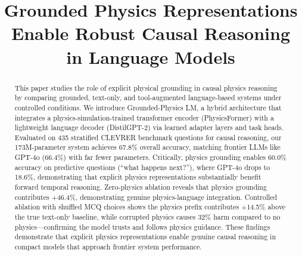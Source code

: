 \documentclass[conference]{IEEEtran}
\theoremstyle{plain}
\theoremstyle{definition}
\theoremstyle{remark}
\begin{document}
\title{Grounded Physics Representations Enable Robust Causal Reasoning in Language Models}


\author{}

\maketitle

\begin{abstract}
This paper studies the role of explicit physical grounding in causal physics reasoning by comparing grounded, text-only, and tool-augmented language-based systems under controlled conditions. We introduce Grounded-Physics LM, a hybrid architecture that integrates a physics-simulation-trained transformer encoder (PhysicsFormer) with a lightweight language decoder (DistilGPT-2) via learned adapter layers and task heads. Evaluated on 435 stratified CLEVRER benchmark questions for causal reasoning, our 173M-parameter system achieves 67.8\% overall accuracy, matching frontier LLMs like GPT-4o (66.4\%) with far fewer parameters. Critically, physics grounding enables 60.0\% accuracy on predictive questions (``what happens next?''), where GPT-4o drops to 18.6\%, demonstrating that explicit physics representations substantially benefit forward temporal reasoning. Zero-physics ablation reveals that physics grounding contributes +46.4\%, demonstrating genuine physics-language integration. Controlled ablation with shuffled MCQ choices shows the physics prefix contributes +14.5\% above the true text-only baseline, while corrupted physics causes 32\% harm compared to no physics---confirming the model trusts and follows physics guidance. These findings demonstrate that explicit physics representations enable genuine causal reasoning in compact models that approach frontier system performance.
\end{abstract}
\end{document}
